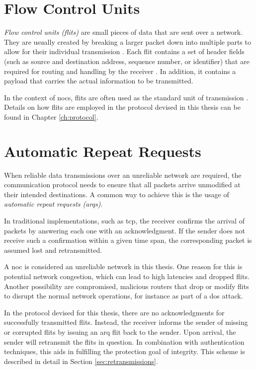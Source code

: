%
\section{Flow Control Units}\label{sec:flits}
\textit{Flow control units (flits)} are small pieces of data that are sent over a network. They are usually created by breaking a larger
packet down into multiple parts to allow for their individual transmission \cite[6]{flitslecturecmu}. Each flit contains a set of header fields (such as source and
destination address, sequence number, or identifier) that are required for routing and handling by the receiver \cite[2]{flitslectureutah}.
In addition, it contains a payload that carries the actual information to be transmitted. %

In the context of \glspl{noc}, flits are often used as the standard unit of transmission \cite[51\psqq]{tatas16designingnocs}. Details on how flits
are employed in the protocol devised in this thesis can be found in Chapter \ref{ch:protocol}.

\section{Automatic Repeat Requests}\label{sec:arqs}
When reliable data transmissions over an unreliable network are required, the communication protocol needs to ensure that all packets arrive unmodified
at their intended destinations. A common way to achieve this is the usage of \textit{automatic repeat requests (\glspl{arq})}.

In traditional implementations, such as \gls{tcp}, the receiver confirms the arrival of packets by answering each one with an acknowledgment.
If the sender does not receive such a confirmation within a given time span, the corresponding packet is assumed lost and retransmitted.

A \gls{noc} is considered an unreliable network in this thesis. One reason for this is potential network congestion, which can lead to high latencies
and dropped flits. Another possibility are compromised, malicious routers that drop or modify flits to disrupt the normal network operations, for
instance as part of a \gls{dos} attack.

In the protocol devised for this thesis, there are no acknowledgments for successfully transmitted flits. Instead, the receiver informs the sender of missing or corrupted
flits by issuing an \gls{arq} flit back to the sender. Upon arrival, the sender will retransmit the flits in question. In combination with
authentication techniques, this aids in fulfilling the protection goal of integrity. This scheme is described in detail in Section
\ref{sec:retransmissions}.

